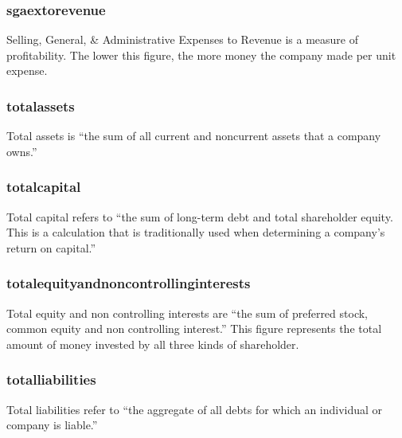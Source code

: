 \subsubsection{sgaextorevenue}
Selling, General, \& Administrative Expenses to Revenue is a measure of profitability. The lower this figure, the more money the company made per unit expense. \cite{sgaextorevenue}

\subsubsection{totalassets}
Total assets is ``the sum of all current and noncurrent assets that a company owns.''\cite{intrinioDataTags}

\subsubsection{totalcapital}
Total capital refers to ``the sum of long-term debt and total shareholder equity. This is a calculation that is traditionally used when determining a company's return on capital.''\cite{intrinioDataTags}

\subsubsection{totalequityandnoncontrollinginterests}
Total equity and non controlling interests are ``the sum of preferred stock, common equity and non controlling interest.''\cite{intrinioDataTags} This figure represents the total amount of money invested by all three kinds of shareholder.

\subsubsection{totalliabilities}
Total liabilities refer to ``the aggregate of all debts for which an individual or company is liable.'' \cite{totalLiabilities}

